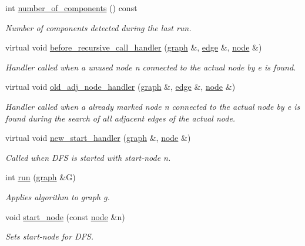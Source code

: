 \begin{DoxyCompactItemize}
int \mbox{\hyperlink{classcomponents_ad3206d2d050ed7719f7140ea3bee81f8}{number\+\_\+of\+\_\+components}} () const
\begin{DoxyCompactList}\small\item\em Number of components detected during the last run. \end{DoxyCompactList}\item 
virtual void \mbox{\hyperlink{classcomponents_a587a9c44a80deb4260ccd0728bfeab0f}{before\+\_\+recursive\+\_\+call\+\_\+handler}} (\mbox{\hyperlink{classgraph}{graph}} \&, \mbox{\hyperlink{classedge}{edge}} \&, \mbox{\hyperlink{classnode}{node}} \&)
\begin{DoxyCompactList}\small\item\em Handler called when a unused node {\itshape n} connected to the actual node by {\itshape e} is found. \end{DoxyCompactList}\item 
virtual void \mbox{\hyperlink{classcomponents_afcf7a0bee5104bba7986039a9d6bd1ee}{old\+\_\+adj\+\_\+node\+\_\+handler}} (\mbox{\hyperlink{classgraph}{graph}} \&, \mbox{\hyperlink{classedge}{edge}} \&, \mbox{\hyperlink{classnode}{node}} \&)
\begin{DoxyCompactList}\small\item\em Handler called when a already marked node {\itshape n} connected to the actual node by {\itshape e} is found during the search of all adjacent edges of the actual node. \end{DoxyCompactList}\item 
virtual void \mbox{\hyperlink{classcomponents_af53365bd737b34cf63e4a6b10879ffcc}{new\+\_\+start\+\_\+handler}} (\mbox{\hyperlink{classgraph}{graph}} \&, \mbox{\hyperlink{classnode}{node}} \&)
\begin{DoxyCompactList}\small\item\em Called when D\+FS is started with start-\/node {\itshape n}. \end{DoxyCompactList}\item 
int \mbox{\hyperlink{classdfs_af0863b8974d5fd58cd0375c78ed8163b}{run}} (\mbox{\hyperlink{classgraph}{graph}} \&G)
\begin{DoxyCompactList}\small\item\em Applies algorithm to graph g. \end{DoxyCompactList}\item 
void \mbox{\hyperlink{classdfs_aad21fd0d3036350fd341f877d5747852}{start\+\_\+node}} (const \mbox{\hyperlink{classnode}{node}} \&n)
\begin{DoxyCompactList}\small\item\em Sets start-\/node for D\+FS. \end{DoxyCompactList}\item 

\end{DoxyCompactItemize}
